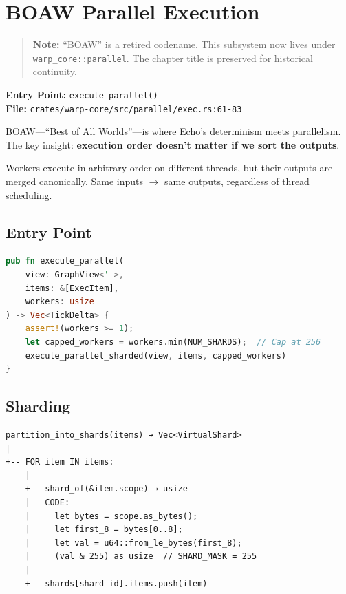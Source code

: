
\chapter{BOAW Parallel Execution}
\label{chap:tour-boaw}

\begin{quote}
\textbf{Note:} ``BOAW'' is a retired codename. This subsystem now lives under
\texttt{warp\_core::parallel}. The chapter title is preserved for historical
continuity.
\end{quote}

\textbf{Entry Point:} \texttt{execute\_parallel()} \\
\textbf{File:} \texttt{crates/warp-core/src/parallel/exec.rs:61-83}

\begin{bigpicture}
BOAW---``Best of All Worlds''---is where Echo's determinism meets parallelism. The key insight: \textbf{execution order doesn't matter if we sort the outputs}.

Workers execute in arbitrary order on different threads, but their outputs are merged canonically. Same inputs $\rightarrow$ same outputs, regardless of thread scheduling.
\end{bigpicture}

\section{Entry Point}

\begin{lstlisting}[language=Rust]
pub fn execute_parallel(
    view: GraphView<'_>,
    items: &[ExecItem],
    workers: usize
) -> Vec<TickDelta> {
    assert!(workers >= 1);
    let capped_workers = workers.min(NUM_SHARDS);  // Cap at 256
    execute_parallel_sharded(view, items, capped_workers)
}
\end{lstlisting}

\section{Sharding}

\begin{verbatim}
partition_into_shards(items) → Vec<VirtualShard>
|
+-- FOR item IN items:
    |
    +-- shard_of(&item.scope) → usize
    |   CODE:
    |     let bytes = scope.as_bytes();
    |     let first_8 = bytes[0..8];
    |     let val = u64::from_le_bytes(first_8);
    |     (val & 255) as usize  // SHARD_MASK = 255
    |
    +-- shards[shard_id].items.push(item)
\end{verbatim}

